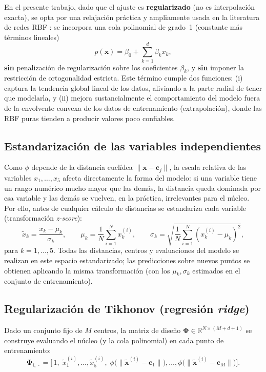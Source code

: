 \documentclass[11pt,a4paper]{article}
\newcommand{\R}{\mathbb{R}}
\newcommand{\Phimat}{\boldsymbol{\Phi}}
\begin{document}
En el presente trabajo, dado que el ajuste es \textbf{regularizado} (no es
interpolaci\'on exacta), se opta por una relajaci\'on pr\'actica y ampliamente
usada en la literatura de redes RBF \cite{chen1991}: se incorpora una cola
polinomial de grado~1 (constante m\'as t\'erminos lineales)
\[
p(\mathbf{x}) = \beta_0 + \sum_{k=1}^{d} \beta_k x_k,
\]
\textbf{sin} penalizaci\'on de regularizaci\'on sobre los coeficientes
$\beta_k$, y \textbf{sin} imponer la restricci\'on de ortogonalidad estricta.
Este t\'ermino cumple dos funciones: (i) captura la tendencia global lineal
de los datos, aliviando a la parte radial de tener que modelarla, y (ii)
mejora sustancialmente el comportamiento del modelo fuera de la envolvente
convexa de los datos de entrenamiento (extrapolaci\'on), donde las RBF puras
tienden a producir valores poco confiables.

\subsection{Estandarizaci\'on de las variables independientes}

Como $\phi$ depende de la distancia eucl\'idea $\lVert \mathbf{x}-\mathbf{c}_j
\rVert$, la escala relativa de las variables $x_1,\dots,x_5$ afecta
directamente la forma del modelo: si una variable tiene un rango num\'erico
mucho mayor que las dem\'as, la distancia queda dominada por esa variable y
las dem\'as se vuelven, en la pr\'actica, irrelevantes para el n\'ucleo. Por
ello, antes de cualquier c\'alculo de distancias se estandariza cada variable
(transformaci\'on \emph{z-score}):
\[
\tilde x_k = \frac{x_k - \mu_k}{\sigma_k}, \qquad
\mu_k = \frac{1}{N}\sum_{i=1}^N x_k^{(i)}, \qquad
\sigma_k = \sqrt{\frac{1}{N}\sum_{i=1}^N \left(x_k^{(i)}-\mu_k\right)^2},
\]
para $k=1,\dots,5$. Todas las distancias, centros y evaluaciones del modelo se
realizan en este espacio estandarizado; las predicciones sobre nuevos puntos
se obtienen aplicando la misma transformaci\'on (con los $\mu_k,\sigma_k$
estimados en el conjunto de entrenamiento).

\subsection{Regularizaci\'on de Tikhonov (regresi\'on \emph{ridge})}
\label{subsec:ridge}

Dado un conjunto fijo de $M$ centros, la matriz de dise\~no
$\Phimat \in \R^{N\times(M+d+1)}$ se construye evaluando el n\'ucleo (y la
cola polinomial) en cada punto de entrenamiento:
\[
\Phimat_{i,\,\cdot} = \Big[\, 1,\; \tilde x_1^{(i)}, \dots, \tilde
x_5^{(i)},\; \phi\big(\lVert \tilde{\mathbf{x}}^{(i)}-\mathbf{c}_1\rVert\big),
\dots, \phi\big(\lVert \tilde{\mathbf{x}}^{(i)}-\mathbf{c}_M\rVert\big)\Big].
\]
\end{document}

